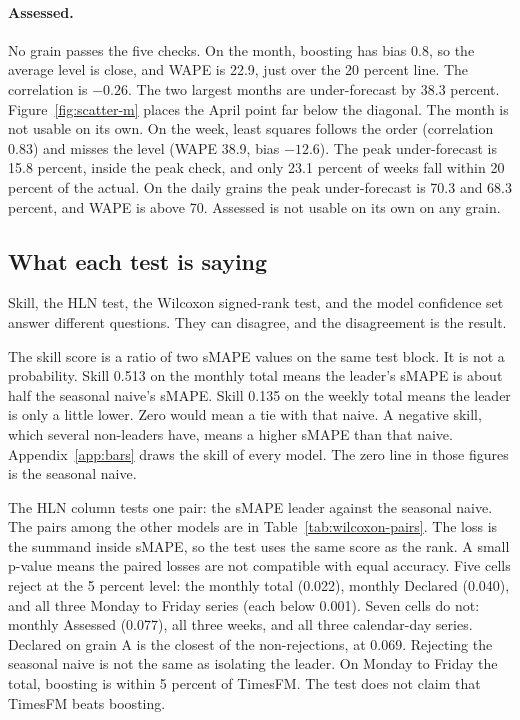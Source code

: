 \paragraph{Assessed.}
No grain passes the five checks.
On the month, boosting has bias 0.8, so the average level is close, and WAPE is 22.9, just over the 20 percent line.
The correlation is $-0.26$.
The two largest months are under-forecast by 38.3 percent.
Figure~\ref{fig:scatter-m} places the April point far below the diagonal.
The month is not usable on its own.
On the week, least squares follows the order (correlation 0.83) and misses the level (WAPE 38.9, bias $-12.6$).
The peak under-forecast is 15.8 percent, inside the peak check, and only 23.1 percent of weeks fall within 20 percent of the actual.
On the daily grains the peak under-forecast is 70.3 and 68.3 percent, and WAPE is above 70.
Assessed is not usable on its own on any grain.

\subsection{What each test is saying}
\label{sec:read-tests}

Skill, the HLN test, the Wilcoxon signed-rank test, and the model confidence set answer different questions.
They can disagree, and the disagreement is the result.

The skill score is a ratio of two sMAPE values on the same test block.
It is not a probability.
Skill 0.513 on the monthly total means the leader's sMAPE is about half the seasonal naive's sMAPE.
Skill 0.135 on the weekly total means the leader is only a little lower.
Zero would mean a tie with that naive.
A negative skill, which several non-leaders have, means a higher sMAPE than that naive.
Appendix~\ref{app:bars} draws the skill of every model.
The zero line in those figures is the seasonal naive.

The HLN column tests one pair: the sMAPE leader against the seasonal naive.
The pairs among the other models are in Table~\ref{tab:wilcoxon-pairs}.
The loss is the summand inside sMAPE, so the test uses the same score as the rank.
A small p-value means the paired losses are not compatible with equal accuracy.
Five cells reject at the 5 percent level: the monthly total (0.022), monthly Declared (0.040), and all three Monday to Friday series (each below 0.001).
Seven cells do not: monthly Assessed (0.077), all three weeks, and all three calendar-day series.
Declared on grain A is the closest of the non-rejections, at 0.069.
Rejecting the seasonal naive is not the same as isolating the leader.
On Monday to Friday the total, boosting is within 5 percent of TimesFM.
The test does not claim that TimesFM beats boosting.

